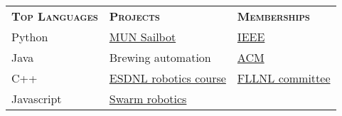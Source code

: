 \documentclass[calibri]{mcdowellcv}
\begin{document}
	
	\begin{tabu} to 1\textwidth { X[l]  X[l] X[l] }
		\Large{\textsc{\textbf{Top Languages}}} & \Large{\textsc{\textbf{Projects}}} & \Large{\textsc{\textbf{Memberships}}} \\
			
		Python &
		\href{http://munsailbot.blogspot.ca/}{MUN Sailbot} & 
		\href{http://ewh.ieee.org/r7/newfoundland_labrador/}{IEEE}\\
		
		Java &
		Brewing automation &
		\href{https://www.acm.org/}{ACM} \\
		
		C++ &
		\href{https://www.mun.ca/science/community/enrichment.php}{ESDNL robotics course} &
		\href{http://fllnl.org/}{FLLNL committee} \\
		 
		Javascript &
		\href{https://code.google.com/archive/p/arbot/}{Swarm robotics} &  \\
	\end{tabu}
	
\end{document}
